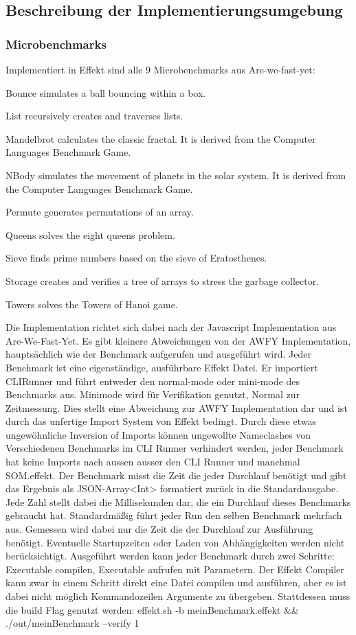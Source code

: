 \subsection{Beschreibung der Implementierungsumgebung}

\subsubsection{ Microbenchmarks }
Implementiert in Effekt sind alle 9 Microbenchmarks aus Are-we-fast-yet:

Bounce simulates a ball bouncing within a box.

List recursively creates and traverses lists.

Mandelbrot calculates the classic fractal. It is derived from the Computer Languages Benchmark Game.

NBody simulates the movement of planets in the solar system. It is derived from the Computer Languages Benchmark Game.

Permute generates permutations of an array.

Queens solves the eight queens problem.

Sieve finds prime numbers based on the sieve of Eratosthenes.

Storage creates and verifies a tree of arrays to stress the garbage collector.

Towers solves the Towers of Hanoi game.

Die Implementation richtet sich dabei nach der Javascript Implementation aus Are-We-Fast-Yet.
Es gibt kleinere Abweichungen von der AWFY Implementation, hauptsächlich wie der Benchmark aufgerufen und ausgeführt wird. 
Jeder Benchmark ist eine eigenständige, ausführbare Effekt Datei. Er importiert CLIRunner und führt entweder den normal-mode oder mini-mode des Benchmarks aus. Minimode wird für Verifikation genutzt, Normal zur Zeitmessung.
Dies stellt eine Abweichung zur AWFY Implementation dar und ist durch das unfertige Import System von Effekt bedingt.
Durch diese etwas ungewöhnliche Inversion of Imports können ungewollte Nameclashes von Verschiedenen Benchmarks im CLI Runner verhindert werden, jeder Benchmark hat keine Imports nach aussen ausser den CLI Runner und manchmal SOM.effekt.
Der Benchmark misst die Zeit die jeder Durchlauf benötigt und gibt das Ergebnis als JSON-Array<Int> formatiert zurück in die Standardausgabe. Jede Zahl stellt dabei die Millisekunden dar, die ein Durchlauf dieses Benchmarks gebraucht hat.
Standardmäßig führt jeder Run den selben Benchmark mehrfach aus.
Gemessen wird dabei nur die Zeit die der Durchlauf zur Ausführung benötigt. Eventuelle Startupzeiten oder Laden von Abhängigkeiten werden nicht berücksichtigt.
Ausgeführt werden kann jeder Benchmark durch zwei Schritte: Executable compilen, Executable aufrufen mit Parametern.
Der Effekt Compiler kann zwar in einem Schritt direkt eine Datei compilen und ausführen, aber es ist dabei nicht möglich Kommandozeilen Argumente zu übergeben.
Stattdessen muss die build Flag genutzt werden:
effekt.sh -b meinBenchmark.effekt && ./out/meinBenchmark --verify 1


